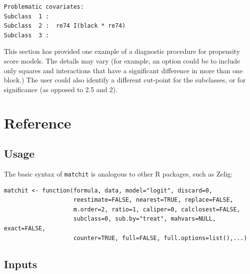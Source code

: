 \documentclass[oneside,letterpaper,titlepage]{article}
\begin{document}
\begin{verbatim}
Problematic covariates:
Subclass  1 :  
Subclass  2 :  re74 I(black * re74)
Subclass  3 :  
\end{verbatim}

This section has provided one example of a diagnostic procedure for
propensity score models.  The details may vary (for example, an option
could be to include only squares and interactions that have a
significant difference in more than one block.)  The user could also
identify a different cut-point for the subclasses, or for significance
(as opposed to 2.5 and 2).

\section{Reference}

\subsection{Usage}

The basic syntax of \texttt{matchit} is analogous to other R packages,
such as Zelig:

\begin{verbatim}
matchit <- function(formula, data, model="logit", discard=0,
                    reestimate=FALSE, nearest=TRUE, replace=FALSE,
                    m.order=2, ratio=1, caliper=0, calclosest=FALSE,
                    subclass=0, sub.by="treat", mahvars=NULL, exact=FALSE,
                    counter=TRUE, full=FALSE, full.options=list(),...)
\end{verbatim}

\subsection{Inputs}
\end{document}

